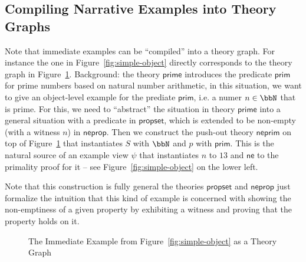 \documentclass[11pt]{bluenote}
\def\cn#1{\mathsf{#1}}
\begin{document}
\subsection{Compiling Narrative Examples into Theory Graphs}

Note that immediate examples can be ``compiled'' into a theory graph. For instance the one
in Figure~\ref{fig:simple-object} directly corresponds to the theory graph in
Figure~\ref{fig:so-tg}. Background: the theory $\cn{prime}$ introduces the predicate
$\cn{prim}$ for prime numbers based on natural number arithmetic, in this situation, we
want to give an object-level example for the prediate $\cn{prim}$, i.e. a numer $n\in\bbN$
that is prime. For this, we need to ``abstract'' the situation in theory $\cn{prime}$ into
a general situation with a predicate in $\cn{propset}$, which is extended to be non-empty
(with a witness $n$) in $\cn{neprop}$. Then we construct the push-out theory $\cn{neprim}$
on top of Figure~\ref{fig:so-tg} that instantiates $S$ with $\bbN$ and $p$ with
$\cn{prim}$. This is the natural source of an example view $\psi$ that instantiates $n$ to
$13$ and $\cn{ne}$ to the primality proof for it -- see Figure~\ref{fig:simple-object} on
the lower left.

Note that this construction is fully general the theories $\cn{propset}$ and $\cn{neprop}$
just formalize the intuition that this kind of example is concerned with showing the
non-emptiness of a given property by exhibiting a witness and proving that the property
holds on it.

\begin{figure}[ht]\centering
{}
\caption{The Immediate Example from Figure~\ref{fig:simple-object} as a Theory
  Graph}\label{fig:so-tg}
\end{figure}
\end{document}
